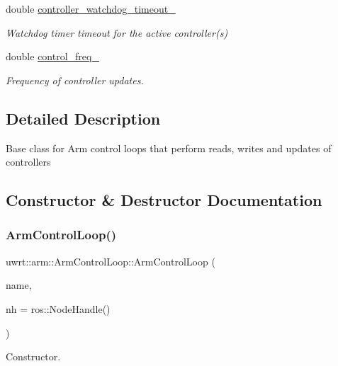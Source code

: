 \begin{DoxyCompactItemize}
double \hyperlink{classuwrt_1_1arm_1_1_arm_control_loop_a28d7faaababb37ce0ffbb705ffe4fe0a}{controller\+\_\+watchdog\+\_\+timeout\+\_\+}
\begin{DoxyCompactList}\small\item\em Watchdog timer timeout for the active controller(s) \end{DoxyCompactList}\item 
double \hyperlink{classuwrt_1_1arm_1_1_arm_control_loop_a8c03c0b16204b0a38c1233ba0ea6ad0e}{control\+\_\+freq\+\_\+}
\begin{DoxyCompactList}\small\item\em Frequency of controller updates. \end{DoxyCompactList}\end{DoxyCompactItemize}


\subsection{Detailed Description}
Base class for Arm control loops that perform reads, writes and updates of controllers 

\subsection{Constructor \& Destructor Documentation}
\mbox{\label{classuwrt_1_1arm_1_1_arm_control_loop_a205726d352abb0e7696c10e337db0347}} 
\subsubsection{\texorpdfstring{Arm\+Control\+Loop()}{ArmControlLoop()}}
{\footnotesize\ttfamily uwrt\+::arm\+::\+Arm\+Control\+Loop\+::\+Arm\+Control\+Loop (\begin{DoxyParamCaption}\item[{std\+::string}]{name,  }\item[{const ros\+::\+Node\+Handle \&}]{nh = {\ttfamily ros\+:\+:NodeHandle()} }\end{DoxyParamCaption})}



Constructor. 


